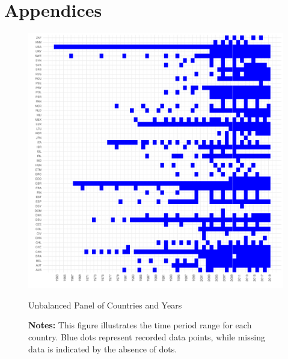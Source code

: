 \section*{Appendices}
\small

\newpage

\newpage

\newpage

\newpage
\begin{figure}[h!]
	\centering
	\includegraphics[width=1\linewidth]{figs/panel.pdf}
	\caption{Unbalanced Panel of Countries and Years}
	\label{fig:panel}
	\captionsetup{font=footnotesize}
	\caption*{\textbf{Notes:} This figure illustrates the time period range for each country. Blue dots represent recorded data points, while missing data is indicated by the absence of dots.}
\end{figure}


